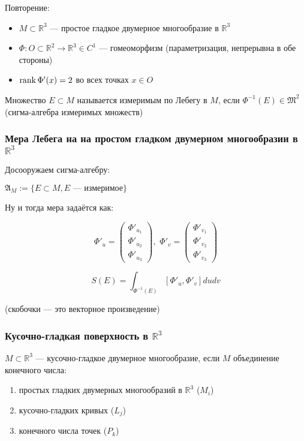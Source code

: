 \documentclass{article}
\def\dbl{\,\,}
\begin{document}
Повторение:

\begin{itemize}
    \item $M \subset \mathbb{R}^3$ --- простое гладкое двумерное многообразие в $\mathbb{R}^3$
    \item $\Phi: O \subset \mathbb{R}^2 \rightarrow \mathbb{R}^3 \in C^1$ --- гомеоморфизм (параметризация, непрерывна в обе стороны)
    \item $\rank \Phi'(x) = 2$ во всех точках $x \in O$
\end{itemize}

Множество $E \subset M$ называется измеримым по Лебегу в $M$, если $\Phi^{-1}(E) \in \mathfrak{M}^2$ (сигма-алгебра измеримых множеств)

\subsubsection{Мера Лебега на на простом гладком двумерном многообразии в $\mathbb{R}^3$}

Досооружаем сигма-алгебру:

$\mathfrak{A}_M := \{ E \subset M, E \text{ --- измеримое}\}$

Ну и тогда мера задаётся как:

\[\Phi'_u = \begin{pmatrix}
    \Phi'_{u_1}\\
    \Phi'_{u_2}\\
    \Phi'_{u_3}
\end{pmatrix}, \dbl \Phi'_{v} = \begin{pmatrix}
    \Phi'_{v_1}\\
    \Phi'_{v_2}\\
    \Phi'_{v_3}
\end{pmatrix}\]

\[S(E) = \int_{\Phi^{-1}(E)} [\Phi'_u, \Phi'_v]du dv\]

(скобочки --- это векторное произведение)

\subsubsection{Кусочно-гладкая поверхность в $\mathbb{R}^3$}

$M \subset \mathbb{R}^3$ --- кусочно-гладкое двумерное многообразие, если $M$ объединение конечного числа:

\begin{enumerate}
    \item простых гладких двумерных многообразий в $\mathbb{R}^3$ ($M_i$)
    \item кусочно-гладких кривых ($L_j$)
    \item конечного числа точек ($P_k$)
\end{enumerate}
\end{document}
